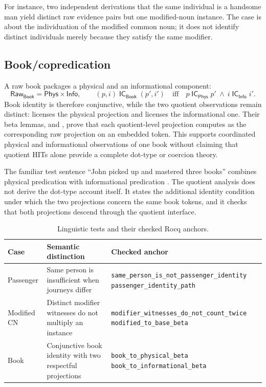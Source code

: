\documentclass[11pt]{article}
\newcommand{\Raw}{\mathsf{Raw}}
\newcommand{\IC}{\mathsf{IC}}
\begin{document}
For instance, two independent derivations that the same individual is a
handsome man yield distinct raw evidence pairs but one modified-noun instance.
The case is about the individuation of the modified common noun; it does not
identify distinct individuals merely because they satisfy the same modifier.

\subsection{Book/copredication}

A raw book packages a physical and an informational component:
\[
  \Raw_{\mathsf{Book}}=\mathsf{Phys}\times\mathsf{Info},
  \qquad
  (p,i)\;\IC_{\mathsf{Book}}\;(p',i')
  \quad\text{iff}\quad
  p\;\IC_{\mathsf{Phys}}\;p'\ \wedge\ i\;\IC_{\mathsf{Info}}\;i'.
\]
Book identity is therefore conjunctive, while the two quotient observations
remain distinct:  licenses the physical
projection and  licenses the
informational one.  Their beta lemmas,
 and , prove
that each quotient-level projection computes as the corresponding raw
projection on an embedded token.  This supports coordinated physical and
informational observations of one book without claiming that quotient HITs
alone provide a complete dot-type or coercion theory.

The familiar test sentence ``John picked up and mastered three books'' combines
physical predication with informational predication \cite{ChatzikyriakidisLuo2015}.
The quotient analysis does not derive the dot-type account itself.  It states
the additional identity condition under which the two projections concern the
same book tokens, and it checks that both projections descend through the
quotient interface.

\begin{table}[H]
\centering
\small
\caption{Linguistic tests and their checked Rocq anchors.}
\label{tab:case-artifacts}
\begin{tabularx}{\textwidth}{@{}>{\raggedright\arraybackslash}p{}>{\raggedright\arraybackslash}p{}X@{}}
\toprule
Case & Semantic distinction & Checked anchor \\
\midrule
Passenger & Same person is insufficient when journeys differ &
\scriptsize\texttt{same\_person\_is\_not\_passenger\_identity}\newline
\scriptsize\texttt{passenger\_identity\_path} \\
Modified CN & Distinct modifier witnesses do not multiply an instance &
\scriptsize\texttt{modifier\_witnesses\_do\_not\_count\_twice}\newline
\scriptsize\texttt{modified\_to\_base\_beta} \\
Book & Conjunctive book identity with two respectful projections &
\scriptsize\texttt{book\_to\_physical\_beta}\newline
\scriptsize\texttt{book\_to\_informational\_beta} \\
\bottomrule
\end{tabularx}
\end{table}
\end{document}
